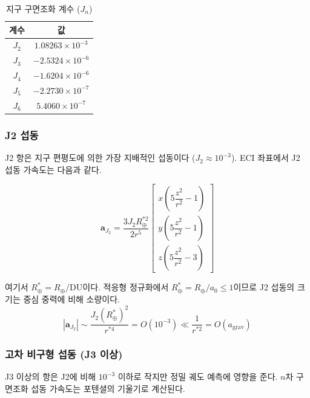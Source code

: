 \documentclass[11pt]{article}
\begin{document}
\begin{table}[h]
  \centering
  \caption{지구 구면조화 계수 ($J_n$)}
  \label{tab:Jn}
  \begin{tabular}{cc}
    \toprule
    계수 & 값 \\
    \midrule
    $J_2$ & $1.08263 \times 10^{-3}$ \\
    $J_3$ & $-2.5324 \times 10^{-6}$ \\
    $J_4$ & $-1.6204 \times 10^{-6}$ \\
    $J_5$ & $-2.2730 \times 10^{-7}$ \\
    $J_6$ & $5.4060 \times 10^{-7}$ \\
    \bottomrule
  \end{tabular}
\end{table}

\subsubsection{J2 섭동}

J2 항은 지구 편평도에 의한 가장 지배적인 섭동이다 ($J_2 \approx 10^{-3}$).
ECI 좌표에서 J2 섭동 가속도는 다음과 같다.

\begin{equation}
  \mathbf{a}_{J_2} = \frac{3J_2 R_\oplus^{*2}}{2r^5}
  \begin{bmatrix}
    x\!\left(5\dfrac{z^2}{r^2}-1\right)\\[6pt]
    y\!\left(5\dfrac{z^2}{r^2}-1\right)\\[6pt]
    z\!\left(5\dfrac{z^2}{r^2}-3\right)
  \end{bmatrix}
  \label{eq:J2}
\end{equation}

여기서 $R_\oplus^* = R_\oplus/\mathrm{DU}$이다.
적응형 정규화에서 $R_\oplus^* = R_\oplus/a_0 \leq 1$이므로
J2 섭동의 크기는 중심 중력에 비해 소량이다.
\begin{equation}
  |\mathbf{a}_{J_2}| \sim \frac{J_2 (R_\oplus^*)^2}{r^{*4}} = O(10^{-3})
  \ll \frac{1}{r^{*2}} = O(a_\mathrm{grav})
\end{equation}

\subsubsection{고차 비구형 섭동 (J3 이상)}

J3 이상의 항은 J2에 비해 $10^{-3}$ 이하로 작지만 정밀 궤도 예측에 영향을 준다.
$n$차 구면조화 섭동 가속도는 포텐셜의 기울기로 계산된다.
\end{document}

